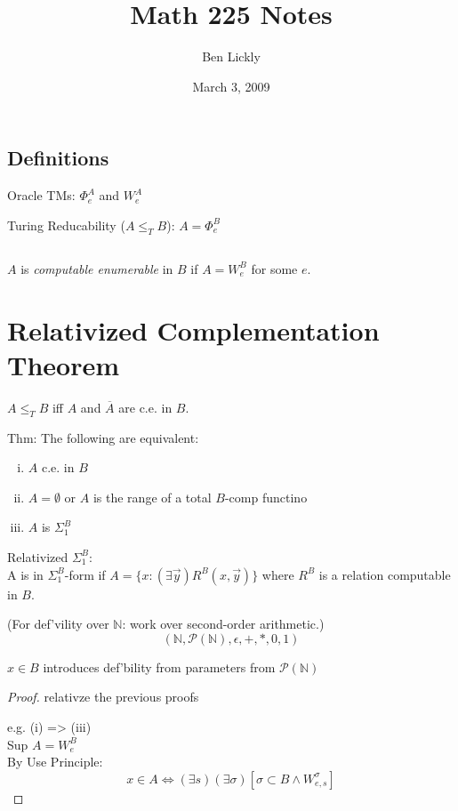 \documentclass[12pt]{article}
\author{Ben Lickly}
\date{March 3, 2009}
\title{Math 225 Notes}
\newcommand{\Nat}{\ensuremath{\mathbb{N}}}
\newcommand{\Conj}[1]{\ensuremath{\overline{#1}}}
\newcommand{\Pow}[1]{\ensuremath{\mathcal{P}(#1)}}
\begin{document}
\maketitle

\subsection*{Definitions}
Oracle TMs:
$\Phi^A_e$ and $W^A_e$

Turing Reducability
($A \le_T B$):
$A = \Phi^B_e$

\subsection*{}
$A$ is \textit{computable enumerable} in $B$ if $A = W^B_e$ for some $e$.

\section*{Relativized Complementation Theorem}
 $A \le_T B$ iff $A$ and $\Conj{A}$ are c.e. in $B$.

Thm: The following are equivalent:
\begin{enumerate}[(i)]
\item $A$ c.e. in $B$
\item $A = \emptyset$ or $A$ is the range of a total $B$-comp functino
\item $A$ is $\Sigma_1^B$
\end{enumerate}

Relativized $\Sigma_1^B$: \\
	A is in $\Sigma_1^B$-form if $A = \{ x : (\exists \vec{y}) R^B(x, \vec{y}) \}$
	where $R^B$ is a relation computable in $B$.

(For def'vility over $\Nat$: work over second-order arithmetic.)
\[ (\Nat, \Pow{\Nat},    \epsilon, +, *, 0, 1) \]%

 $x 	\in 	B$
introduces def'bility from parameters from $\Pow{\Nat}$

\begin{proof}
 relativze the previous proofs

e.g. (i) => (iii) \\
Sup $A = W^B_e$ \\
By Use Principle: 
\[
 x \in A \Leftrightarrow (\exists s) (\exists \sigma) [ \sigma \subset B \wedge W_{e,s}^\sigma]
\]
\end{proof}
\end{document}
